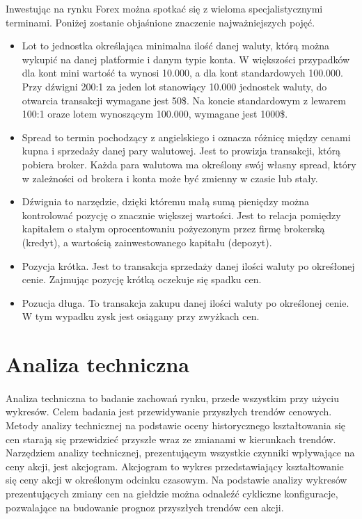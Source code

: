 \documentclass[pdflatex,11pt]{aghdpl}
\begin{document}
Inwestując na rynku Forex można spotkać się z wieloma specjalistycznymi terminami. Poniżej zostanie objaśnione znaczenie najważniejszych pojęć.
\begin{itemize}
\item Lot to jednostka określająca minimalna ilość danej waluty, którą można wykupić na danej platformie i danym typie konta. W większości przypadków dla kont mini wartość ta wynosi 10.000, a dla kont standardowych 100.000. Przy dźwigni 200:1 za jeden lot stanowiący 10.000 jednostek waluty, do otwarcia transakcji wymagane jest 50\$. Na koncie standardowym z lewarem 100:1 oraze lotem wynoszącym 100.000, wymagane jest 1000\$.
\item Spread to termin pochodzący z angielskiego i oznacza różnicę między cenami kupna i sprzedaży danej pary walutowej. Jest to prowizja transakcji, którą pobiera broker. Każda para walutowa ma określony swój własny spread, który w zależności od brokera i konta może być zmienny w czasie lub stały.
\item Dźwignia to narzędzie, dzięki któremu małą sumą pieniędzy można kontrolować pozycję o znacznie większej wartości. Jest to relacja pomiędzy kapitałem o stałym oprocentowaniu pożyczonym przez firmę brokerską (kredyt), a wartością zainwestowanego kapitału (depozyt).
\item Pozycja krótka. Jest to transakcja sprzedaży danej ilości waluty po okreśłonej cenie. Zajmując pozycję krótką oczekuje się spadku cen. 
\item Pozucja długa. To transakcja zakupu danej ilości waluty po określonej cenie. W tym wypadku zysk jest osiągany przy zwyżkach cen.
\end{itemize}

\section{Analiza techniczna}
\label{sec:analizatechniczna}
\paragraph{}
Analiza techniczna to badanie zachowań rynku, przede wszystkim przy użyciu wykresów. Celem badania jest przewidywanie przyszłych trendów cenowych\cite{5}. Metody analizy technicznej na podstawie oceny historycznego kształtowania się cen starają się przewidzieć przyszłe wraz ze zmianami w kierunkach trendów. Narzędziem analizy technicznej, prezentującym wszystkie czynniki wpływające na ceny akcji, jest akcjogram. Akcjogram to wykres przedstawiający kształtowanie się ceny akcji w określonym odcinku czasowym. Na podstawie analizy wykresów prezentujących zmiany cen na giełdzie można odnaleźć cykliczne konfiguracje, pozwalające na budowanie prognoz przyszłych trendów cen akcji. 
\end{document}
